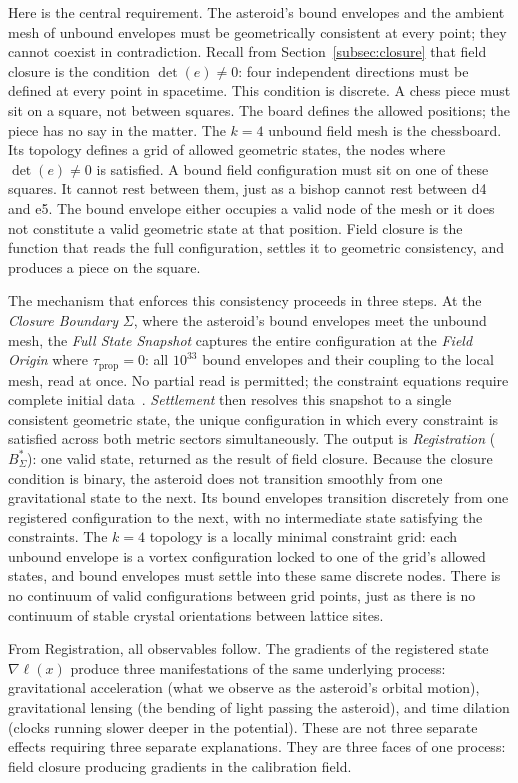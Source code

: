 \documentclass[aps,prd,preprint,superscriptaddress,showpacs,preprintnumbers,amsmath,amssymb,nofootinbib]{revtex4-2}
\begin{document}
Here is the central requirement. The asteroid's bound envelopes and the ambient mesh of unbound envelopes must be geometrically consistent at every point; they cannot coexist in contradiction. Recall from Section~\ref{subsec:closure} that field closure is the condition $\det(e) \neq 0$: four independent directions must be defined at every point in spacetime. This condition is discrete. A chess piece must sit on a square, not between squares. The board defines the allowed positions; the piece has no say in the matter. The $k = 4$ unbound field mesh is the chessboard. Its topology defines a grid of allowed geometric states, the nodes where $\det(e) \neq 0$ is satisfied. A bound field configuration must sit on one of these squares. It cannot rest between them, just as a bishop cannot rest between d4 and e5. The bound envelope either occupies a valid node of the mesh or it does not constitute a valid geometric state at that position. Field closure is the function that reads the full configuration, settles it to geometric consistency, and produces a piece on the square.

The mechanism that enforces this consistency proceeds in three steps. At the \emph{Closure Boundary} $\Sigma$, where the asteroid's bound envelopes meet the unbound mesh, the \emph{Full State Snapshot} captures the entire configuration at the \emph{Field Origin} where $\tau_{\text{prop}} = 0$: all $10^{33}$ bound envelopes and their coupling to the local mesh, read at once. No partial read is permitted; the constraint equations require complete initial data~\cite{choquetbruhat1952}. \emph{Settlement} then resolves this snapshot to a single consistent geometric state, the unique configuration in which every constraint is satisfied across both metric sectors simultaneously. The output is \emph{Registration} ($B^*_\Sigma$): one valid state, returned as the result of field closure. Because the closure condition is binary, the asteroid does not transition smoothly from one gravitational state to the next. Its bound envelopes transition discretely from one registered configuration to the next, with no intermediate state satisfying the constraints. The $k = 4$ topology is a locally minimal constraint grid: each unbound envelope is a vortex configuration locked to one of the grid's allowed states, and bound envelopes must settle into these same discrete nodes. There is no continuum of valid configurations between grid points, just as there is no continuum of stable crystal orientations between lattice sites.

From Registration, all observables follow. The gradients of the registered state $\nabla\ell(x)$ produce three manifestations of the same underlying process: gravitational acceleration (what we observe as the asteroid's orbital motion), gravitational lensing (the bending of light passing the asteroid), and time dilation (clocks running slower deeper in the potential). These are not three separate effects requiring three separate explanations. They are three faces of one process: field closure producing gradients in the calibration field.
\end{document}
